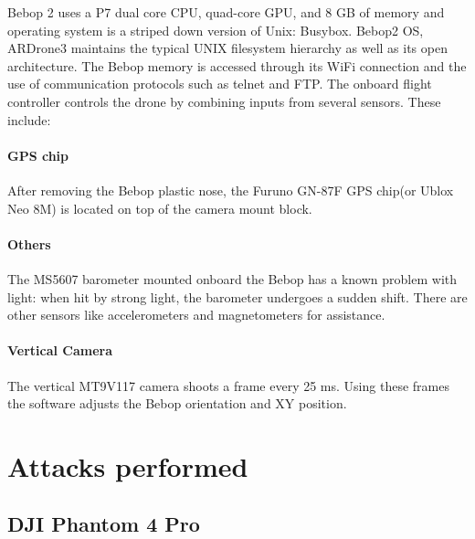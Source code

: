\documentclass[conference]{IEEEtran}
\begin{document}
Bebop 2 uses a P7 dual core CPU, quad-core GPU, and 8 GB of memory and operating system is a striped down version of Unix: Busybox. Bebop2 OS, ARDrone3 maintains the typical UNIX filesystem hierarchy as well as its open architecture.
The Bebop memory is accessed through its WiFi connection and the use of communication protocols such as ​telnet ​and FTP. 
The onboard flight controller controls the drone by combining inputs from several sensors. These include:  
\paragraph{GPS chip} After removing the Bebop plastic nose, the Furuno GN-87F GPS chip(or Ublox Neo 8M) is located on top of the camera mount block. 
\paragraph{Others} The ​MS5607​ barometer mounted onboard the Bebop has a known problem with light: when hit by strong light, the barometer undergoes a sudden shift. There are other sensors like accelerometers and magnetometers for assistance.
\paragraph{Vertical Camera} The vertical ​MT9V117​ camera shoots a frame every 25 ms. Using these frames the software adjusts the Bebop orientation and X­Y position. 



\section{Attacks performed}\label{Attacks performed}
\subsection{DJI Phantom 4 Pro}
\end{document}
